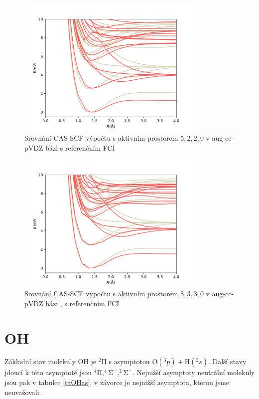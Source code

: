 \begin{figure}
\centering
\includegraphics[width=0.8\textwidth]{../img/BeH-MULTI-DZ-5220.pdf}
\caption{Srovnání CAS-SCF výpočtu s aktivním prostorem $5,2,2,0$ v aug-cc-pVDZ bázi s referenčním FCI}
\label{gr_Beh_5220}
\end{figure}

\begin{figure}
\centering
\includegraphics[width=0.8\textwidth]{../img/BeH-MULTI-DZ-8330.pdf}
\caption{Srovnání CAS-SCF výpočtu s aktivním prostorem $8,3,3,0$ v aug-cc-pVDZ bázi , s referenčním FCI}
\label{gr_Beh_8330}
\end{figure}

\section{OH}
Základní stav molekuly OH je $\mathrm{^2\Pi}$ s asymptotou 
$\mathrm{O}(^3p) + \mathrm{H}(^2s)$. Další 
stavy jdoucí k této asymptotě jsou $\mathrm{^4\Pi, ^4\Sigma^-, ^2\Sigma^- }$.
Nejnižší asymptoty neutrální molekuly jsou pak v tabulce \ref{taOHas}, v závorce je
nejnižší asymptota, kterou jsme neuvažovali.

